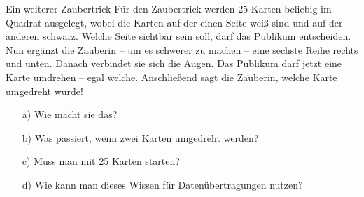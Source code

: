 \documentclass{uebungszettel}
\begin{document}
\begin{aufgabe}{Ein weiterer Zaubertrick}
 Für den Zaubertrick werden 25 Karten beliebig im Quadrat ausgelegt, wobei die Karten auf der einen Seite weiß sind und auf der anderen schwarz.
 Welche Seite sichtbar sein soll, darf das Publikum entscheiden.
 Nun ergänzt die Zauberin -- um es schwerer zu machen -- eine sechste Reihe rechts und unten.
 Danach verbindet sie sich die Augen.
 Das Publikum darf jetzt eine Karte umdrehen -- egal welche.
 Anschließend sagt die Zauberin, welche Karte umgedreht wurde!
\begin{itemize}
 \item [a)] Wie macht sie das?
 \item [b)] Was passiert, wenn zwei Karten umgedreht werden? 
 \item [c)] Muss man mit 25 Karten starten?
 \item [d)] Wie kann man dieses Wissen für Datenübertragungen nutzen? 
\end{itemize}
\end{aufgabe}




\pagebreak
\end{document}
